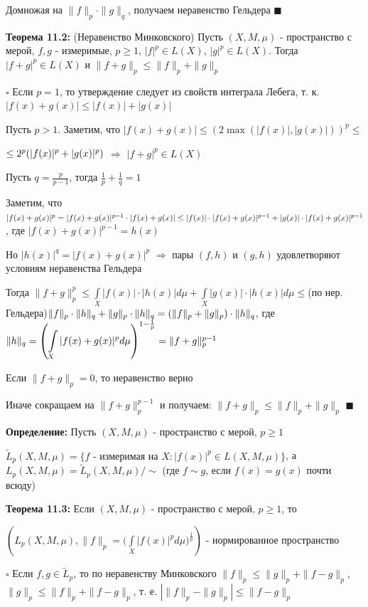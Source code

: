\documentclass[a4paper]{report}
\newcommand*{\hm}[1]{#1\nobreak\discretionary{}%
            {\hbox{$\mathsurround=0pt #1$}}{}}
\begin{document}
Домножая на $\|f\|_p\cdot\|g\|_q$, получаем неравенство Гельдера $\blacksquare$
\bigskip

\noindent\textbf{Теорема 11.2:} (Неравенство Минковского) Пусть $(X,M,\mu)$ - пространство с мерой, $f,g$ - измеримые, $p\ge1$, $|f|^p\in L(X)$, $|g|^p\in L(X)$. 
Тогда $|f+g|^p\in L(X)$ и $\|f+g\|_p\le\|f\|_p+\|g\|_p$

\noindent $\square$ Если $p=1$, то утверждение следует из свойств интеграла Лебега, т. к. $|f(x)+g(x)|\le|f(x)|+|g(x)|$

Пусть $p>1$. Заметим, что $|f(x)+g(x)|\le\left(2\max(|f(x)|,|g(x)|)\right)^p\le$

$\noindent\le2^p(|f(x)|^p+|g(x)|^p)$ $\Rightarrow$ $|f+g|^p\in L(X)$

Пусть $q=\frac{p}{p-1}$, тогда $\frac1p+\frac1q=1$

Заметим, что $|f(x)+g(x)|^p=|f(x)+g(x)|^{p-1}\cdot|f(x)+g(x)|\le|f(x)|\hm\cdot|f(x)+g(x)|^{p-1}+|g(x)|\cdot|f(x)+g(x)|^{p-1}$, где $|f(x)+g(x)|^{p-1}=h(x)$

Но $|h(x)|^q=|f(x)+g(x)|^p$ $\Rightarrow$ пары $(f,h)$ и $(g,h)$ удовлетворяют условиям неравенства Гельдера

Тогда $\|f+g\|_p^p\le\displaystyle\int\limits_X|f(x)|\cdot|h(x)|d\mu+\displaystyle\int\limits_X|g(x)|\cdot|h(x)|d\mu\le$(по нер. Гельдера)$\|f\|_p\hm\cdot\|h\|_q+\|g\|_p\cdot\|h\|_q=\left(\|f\|_p+\|g\|_p\right)\cdot\|h\|_q$, где $\|h\|_q=\left(\displaystyle\int\limits_X|f(x)+g(x)|^pd\mu\right)^{1-\frac1p}\hm=\|f+g\|_p^{p-1}$

Если $\|f+g\|_p=0$, то неравенство верно

Иначе сокращаем на $\|f+g\|_p^{p-1}$ и получаем: $\|f+g\|_p\le\|f\|_p+\|g\|_p$ $\blacksquare$
\bigskip

\noindent\textbf{Определение:} Пусть $(X,M,\mu)$ - пространство с мерой, $p\ge1$

$\tilde L_p(X,M,\mu)=\{f\text{ - измеримая на }X\colon|f(x)|^p\in L(X,M,\mu)\}$, а $L_p(X,M,\mu)=\tilde L_p(X,M,\mu)/\sim$ (где $f\sim g$, если $f(x)=g(x)$ почти всюду)
\bigskip

\noindent\textbf{Теорема 11.3:} Если $(X,M,\mu)$ - пространство с мерой, $p\ge1$, то 

$\left(L_p(X,M,\mu),\|f\|_p=\biggl(\displaystyle\int\limits_X|f(x)|^pd\mu\biggr)^\frac1p\right)$ - нормированное пространство

\noindent $\square$ Если $f,g\in\tilde L_p$, то по неравенству Минковского $\|f\|_p\le\|g\|_p+\|f-g\|_p$, $\|g\|_p\le\|f\|_p+\|f-g\|_p$, т. е. $\left|\|f\|_p-\|g\|_p
\right|\le\|f-g\|_p$
\end{document}
